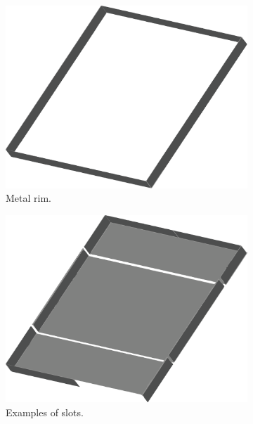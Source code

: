 \begin{figure}[H]
\centering
    \begin{subfigure}[b]{0.3\textwidth}
        \includegraphics[width=\textwidth]{img/metal_rim2.eps}
        \caption{Metal rim.}
        \label{fig:rim}
    \end{subfigure}
    \begin{subfigure}[b]{0.3\textwidth}
        \includegraphics[width=\textwidth]{img/metal_cover_slots.eps}
        \caption{Examples of slots.}
        \label{fig:cover_slots}
    \end{subfigure}
    \begin{subfigure}[b]{0.3\textwidth}

\end{subfigure}
\end{figure}
